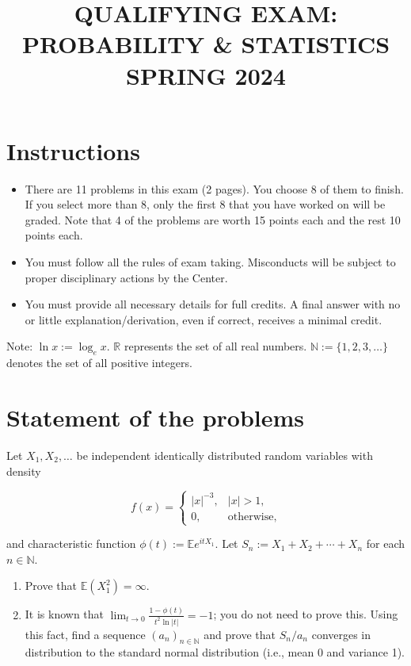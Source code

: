\documentclass[11pt,a4paper]{article}
\title{\textbf{QUALIFYING EXAM: PROBABILITY \& STATISTICS}\\[0.5em]\Large SPRING 2024}
\date{}
\author{}
\newcommand{\examstatement}[1]{%
  \par\addvspace{0.85em}%
  \noindent{\bfseries #1}\par\nobreak\addvspace{0.28em}%
}
\begin{document}
\maketitle
\vspace{-3em}

\tableofcontents

\section{Instructions}
\begin{itemize}
    \item There are 11 problems in this exam (2 pages). You choose 8 of them to finish. If you select more than 8, only the first 8 that you have worked on will be graded. Note that 4 of the problems are worth 15 points each and the rest 10 points each.
    \item You must follow all the rules of exam taking. Misconducts will be subject to proper disciplinary actions by the Center.
    \item You must provide all necessary details for full credits. A final answer with no or little explanation/derivation, even if correct, receives a minimal credit.
\end{itemize}

Note: \( \ln x := \log_e x \). \( \mathbb{R} \) represents the set of all real numbers. \( \mathbb{N} := \{1, 2, 3, \dots\} \) denotes the set of all positive integers.

\section{Statement of the problems}

\examstatement{Problem 1. [10 pts.]}
Let \( X_1, X_2, \dots \) be independent identically distributed random variables with density

\[
f(x) =
\begin{cases}
|x|^{-3}, & |x| > 1, \\
0, & \text{otherwise},
\end{cases}
\]

and characteristic function \( \phi(t) := \mathbb{E} e^{it X_1} \). Let \( S_n := X_1 + X_2 + \cdots + X_n \) for each \( n \in \mathbb{N} \).
\begin{enumerate}[label=(\alph*)]
    \item Prove that \( \mathbb{E}(X_1^2) = \infty \).
    \item It is known that \( \lim_{t \to 0} \frac{1-\phi(t)}{t^2 \ln |t|} = -1 \); you do not need to prove this. Using this fact, find a sequence \( (a_n)_{n \in \mathbb{N}} \) and prove that \( S_n / a_n \) converges in distribution to the standard normal distribution (i.e., mean 0 and variance 1).
\end{enumerate}
\end{document}

